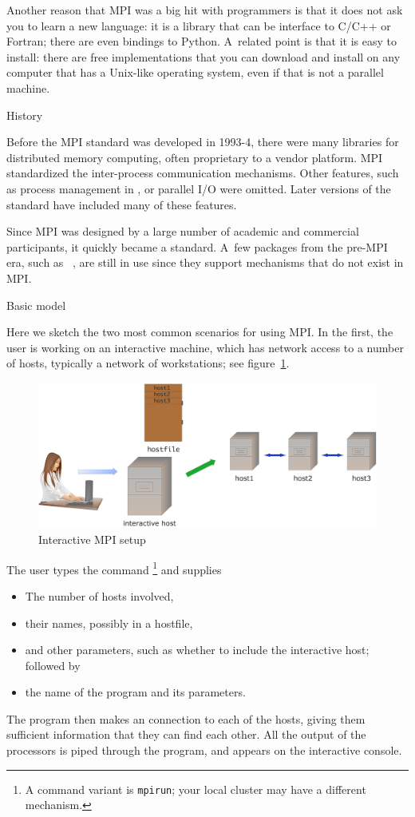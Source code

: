 Another reason that MPI was a big hit with programmers is that
it does not ask you to learn a new language: it is a library that 
can be interface to C/C++ or Fortran; there are even bindings to Python.
A~related point is that it is easy to install: there are free implementations
that you can download and install on any computer that has a Unix-like
operating system, even if that is not a parallel machine.

 {History}

Before the MPI standard was developed in 1993-4, there were many
libraries for distributed memory computing, often proprietary
to a vendor platform. MPI standardized the inter-process communication
mechanisms. Other features, such as process management in ,
or parallel I/O were omitted. Later versions of the standard
have included many of these features.

Since MPI was designed by a large number of academic and commercial
participants, it quickly became a standard. A~few packages
from the pre-MPI era, such as ~\cite{charmpp},
are still in use since they support mechanisms that do not exist
in MPI.

 {Basic model}
\label{sec:mpiexec}

Here we sketch the two most common scenarios for using MPI. In the
first, the user is working on an interactive machine, which has
network access to a number of hosts, typically a network of workstations;
see figure~\ref{fig:mpi-interactive}.
\begin{figure}[ht]
  \includegraphics[scale=.12]{graphics/mpi-interactive}
  \caption{Interactive MPI setup}
  \label{fig:mpi-interactive}
\end{figure}
The user types the command \footnote
{A command variant is \texttt{mpirun}; your local cluster
  may have a different mechanism.}
and supplies
\begin{itemize}
\item The number of hosts involved,
\item their names, possibly in a hostfile,
\item and other parameters, such as whether to include the interactive
  host; followed by
\item the name of the program and its parameters.
\end{itemize}
The  program then makes an  connection
to each of the hosts, giving them sufficient information that they 
can find each other. All the output of the processors is piped through the 
 program, and appears on the interactive console.

